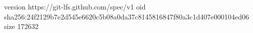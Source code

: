 version https://git-lfs.github.com/spec/v1
oid sha256:24f2129b7e2d545e6620c5b08a0da37c8145816847f80a3c1d407e000104ed06
size 172632
